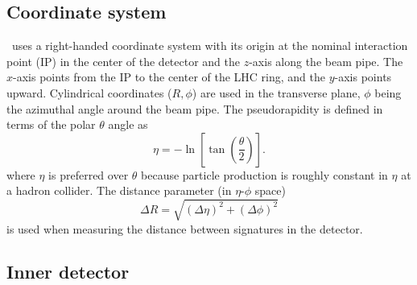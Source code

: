 \subsection{Coordinate system} 
\label{sec:coordinate_system}

\atlas\ uses a right-handed coordinate system with its origin at the nominal
interaction point (IP) in the center of the detector and the $z$-axis
along the beam pipe. The $x$-axis points from the IP to the center of the
LHC ring, and the $y$-axis points upward. Cylindrical coordinates
($R,\phi$) are used in the transverse plane, $\phi$ being the azimuthal
angle around the beam pipe. The pseudorapidity is defined in terms of the
polar $\theta$ angle as
\begin{equation}
  \eta = -\ln\left[\tan(\frac{\theta}{2})\right].
\end{equation}
where $\eta$ is preferred over $\theta$ because particle production is roughly
constant in $\eta$ at a hadron collider.
The distance parameter (in $\eta$-$\phi$ space)
\begin{equation}
  \Delta R = \sqrt{(\Delta \eta)^2 + (\Delta \phi)^2}
\end{equation}
is used when measuring the distance between signatures in the detector.

\subsection{Inner detector} 
\label{sec:id}

